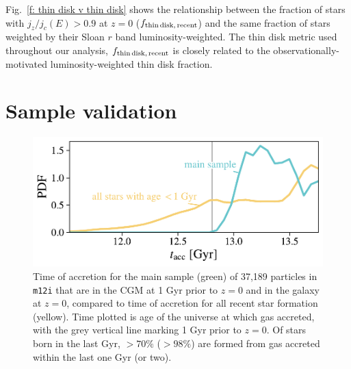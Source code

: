 \documentclass[fleqn,usenatbib]{mnras}
\newcommand{\fthin}{f_{\rm thin\,disk,\,recent}}
\begin{document}
Fig.~\ref{f: thin disk v thin disk} shows the relationship between the fraction of stars with $j_z/j_c(E)>0.9$ at $z=0$ ($\fthin$) and the same fraction of stars weighted by their Sloan $r$ band luminosity-weighted.
The thin disk metric used throughout our analysis, $\fthin$ is closely related to the observationally-motivated luminosity-weighted thin disk fraction.

\section{Sample validation}
\label{s: appendix-sample validation}

\begin{figure}
    \centering
    \includegraphics[width=\columnwidth]{figures/selected_to_all_comparison/tacc_m12i_md.pdf}
    \caption{
    Time of accretion for the main sample (green) of 37,189 particles in \texttt{m12i} that are in the CGM at 1 Gyr prior to $z=0$ and in the galaxy at $z=0$, compared to time of accretion for all recent star formation (yellow).
    Time plotted is age of the universe at which gas accreted, with the grey vertical line marking 1 Gyr prior to $z=0$.
    Of stars born in the last Gyr, $> 70\%$ ($> 98\%$) are formed from gas accreted within the last one Gyr (or two).
    }
    \label{f: sample validation -- tacc}
\end{figure}
\end{document}
